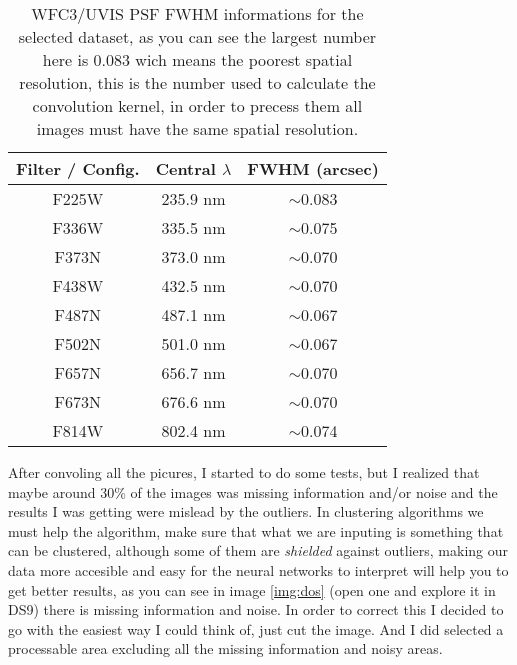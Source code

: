 \documentclass[11pt,fleqn]{book} %
\begin{document}
\begin{table}[h]
  \centering
    \begin{tabular}{ c c c }
    \hline\hline
    
    Filter / Config. & Central $\lambda$ & FWHM (arcsec)\\
    \hline
    
    F225W & 235.9 nm & $\sim$0.083\\
    
    F336W & 335.5 nm & $\sim$0.075\\
    
    F373N & 373.0 nm & $\sim$0.070\\
    
    F438W & 432.5 nm & $\sim$0.070\\
    
    F487N & 487.1 nm & $\sim$0.067\\
    
    F502N & 501.0 nm & $\sim$0.067\\
    
    F657N & 656.7 nm & $\sim$0.070\\
    
    F673N & 676.6 nm & $\sim$0.070\\
    
    F814W & 802.4 nm & $\sim$0.074\\
    
    \hline
  \end{tabular}
  \caption{WFC3/UVIS PSF FWHM informations for the selected dataset, as you can see the largest number here is 0.083 wich means the poorest spatial resolution, this is the number used to calculate the convolution kernel, in order to precess them all images must have the same spatial resolution.}
  \label{tab:dos}
\end{table}

After convoling all the picures, I started to do some tests, but I realized that maybe around 30\% of the images was missing information and/or noise and the results I was getting were mislead by the outliers. In clustering algorithms we must help the algorithm, make sure that what we are inputing is something that can be clustered, although some of them are \emph{shielded} against outliers, making our data more accesible and easy for the neural networks to interpret will help you to get better results, as you can see in image \ref{img:dos} (open one and explore it in DS9) there is missing information and noise. In order to correct this I decided to go with the easiest way I could think of, just cut the image. And I did selected a processable area excluding all the missing information and noisy areas.
\end{document}

